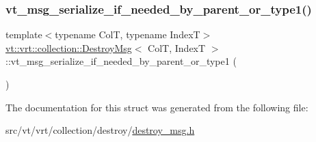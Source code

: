 \mbox{\label{structvt_1_1vrt_1_1collection_1_1_destroy_msg_ae9f2ea1d96f67bdb78a30fe8908eb690}} 
\subsubsection{\texorpdfstring{vt\+\_\+msg\+\_\+serialize\+\_\+if\+\_\+needed\+\_\+by\+\_\+parent\+\_\+or\+\_\+type1()}{vt\_msg\_serialize\_if\_needed\_by\_parent\_or\_type1()}}
{\footnotesize\ttfamily template$<$typename ColT, typename IndexT$>$ \\
\hyperlink{structvt_1_1vrt_1_1collection_1_1_destroy_msg}{vt\+::vrt\+::collection\+::\+Destroy\+Msg}$<$ ColT, IndexT $>$\+::vt\+\_\+msg\+\_\+serialize\+\_\+if\+\_\+needed\+\_\+by\+\_\+parent\+\_\+or\+\_\+type1 (\begin{DoxyParamCaption}\item[{\hyperlink{structvt_1_1vrt_1_1collection_1_1_destroy_msg_a5bf089cacadf94e55e9ae797c4cd0462}{Collection\+Proxy\+Type}}]{ }\end{DoxyParamCaption})}



The documentation for this struct was generated from the following file\+:\begin{DoxyCompactItemize}
\item 
src/vt/vrt/collection/destroy/\hyperlink{destroy__msg_8h}{destroy\+\_\+msg.\+h}\end{DoxyCompactItemize}
